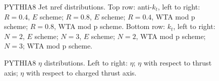 \begin{figure}[H]
\hfill
{}\hfill
{}\hfill
\caption{PYTHIA8 Jet nref distributions. Top row: anti-$k_t$, left to right: $R=0.4$, $E$ scheme; $R=0.8$, $E$ scheme; $R=0.4$, WTA mod p scheme; $R=0.8$, WTA mod p scheme. Bottom row: $k_t$, left to right: $N=2$, $E$ scheme; $N=3$, $E$ scheme; $N=2$, WTA mod p scheme; $N=3$; WTA mod p scheme.}  
\end{figure}

\begin{figure}[H]
\centering
{}\hfill
{}\hfill
{}\hfill
\caption{PYTHIA8 $\eta$ distributions. Left to right: $\eta$; $\eta$ with respect to thrust axis; $\eta$ with respect to charged thrust axis.}
\end{figure}

